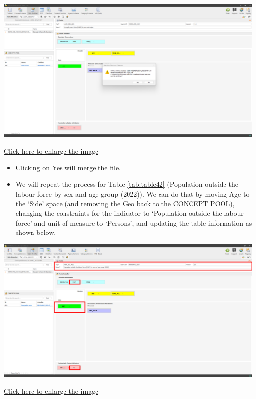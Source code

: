 \documentclass[
]{book}
\providecommand{\tightlist}{%
  \setlength{\itemsep}{0pt}\setlength{\parskip}{0pt}}
\begin{document}
\begin{center}\includegraphics[width=1\linewidth]{./images/image154} \end{center}

\href{images/image154.png}{Click here to enlarge the image}

\begin{itemize}
\tightlist
\item
  Clicking on Yes will merge the file.
\item
  We will repeat the process for Table \ref{tab:table42} (Population outside the labour force by sex and age group (2022)). We can do that by moving Age to the `Side' space (and removing the Geo back to the CONCEPT POOL), changing the constraints for the indicator to `Population outside the labour force' and unit of measure to `Persons', and updating the table information as shown below.
\end{itemize}

\begin{center}\includegraphics[width=1\linewidth]{./images/image156} \end{center}

\href{images/image156.png}{Click here to enlarge the image}
\end{document}
